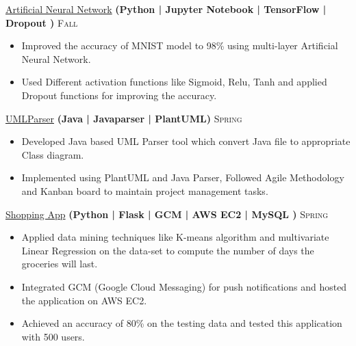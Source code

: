 \documentclass[10pt,a4paper]{article}
\begin{document}
{{\headedsection  %
  {\href{https://github.com/Dhrumil1808/ANN-tensorflow}{Artificial Neural Network}
  \textbf{
  \small{(Python | Jupyter Notebook | TensorFlow | Dropout )}}}
  {\textsc{ Fall }} {%
  
    {\bodytext
    {
    \begin{itemize}
        \item Improved the accuracy of MNIST model to 98\% using multi-layer Artificial Neural Network.
        \item Used Different activation functions like Sigmoid, Relu, Tanh and applied Dropout functions for improving the accuracy.
        
    \end{itemize}}}
}


\headedsection  %
  {\href{https://github.com/Dhrumil1808/umlparser}{UMLParser}
  \textbf{
  \small{(Java | Javaparser | PlantUML)}}}
  {\textsc{Spring }} {%
  
    {\bodytext
    {
    \begin{itemize}
        \item  Developed Java based UML Parser tool which convert Java file to appropriate Class diagram.
        \item Implemented using PlantUML and Java Parser, Followed Agile Methodology and Kanban board to maintain project
              management tasks.
    \end{itemize}}}
}


\headedsection  %
 {\href{https://github.com/Dhrumil1808/ShoppingElf}{Shopping App}
  \textbf{
  \small{(Python | Flask | GCM | AWS EC2 | MySQL )}}}
  {\textsc{Spring }} {%
  
    {\bodytext
    {
    \begin{itemize}
        \item Applied data mining techniques like K-means algorithm and multivariate Linear Regression on the data-set to compute the number of days the groceries will last.
        \item Integrated GCM (Google Cloud Messaging) for push notifications  and hosted  the application on AWS EC2.
        \item Achieved an accuracy of 80\% on the testing data and tested this application with 500 users.
        
    \end{itemize}}}
}


}}
\end{document}
